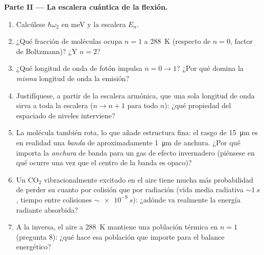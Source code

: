 \begin{problem}
\medskip\noindent\textbf{Parte II --- La escalera cuántica de la flexión.}
\begin{enumerate}[resume]
  \item Calcúlese $\hbar\omega_2$ en meV y la escalera $E_n$.
  \item ¿Qué fracción de moléculas ocupa $n = 1$ a
        \qty{288}{K} (respecto de $n = 0$, factor de Boltzmann)? ¿Y
        $n = 2$?
  \item ¿Qué longitud de onda de fotón impulsa $n = 0 \to 1$? ¿Por qué
        domina la \emph{misma} longitud de onda la emisión?
  \item Justifíquese, a partir de la escalera armónica, que una sola
        longitud de onda sirva a toda la escalera ($n \to n + 1$ para
        todo $n$): ¿qué propiedad del espaciado de niveles interviene?
  \item La molécula también rota, lo que añade estructura fina: el
        rasgo de \qty{15}{\micro m} es en realidad una \emph{banda} de
        aproximadamente \qty{1}{\micro m} de anchura. ¿Por qué importa la
        \emph{anchura} de banda para un gas de efecto invernadero (piénsese
        en qué ocurre una vez que el centro de la banda es opaco)?
  \item Un CO$_2$ vibracionalmente excitado en el aire tiene mucha más
        probabilidad de perder su cuanto por colisión que por radiación
        (vida media radiativa $\sim\qty{1}{s}$, tiempo entre colisiones
        $\sim\qty{e-9}{s}$): ¿adónde va realmente la energía radiante
        absorbida?
  \item A la inversa, el aire a \qty{288}{K} mantiene una población
        térmica en $n = 1$ (pregunta 8): ¿qué hace esa población que
        importe para el balance energético?
\end{enumerate}


\end{problem}

